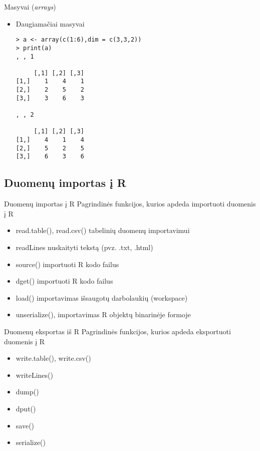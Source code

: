 \documentclass[11pt,xcolor=table]{beamer}
\begin{document}

\begin{frame}[fragile]{Masyvai (\textit{arrays})}
\begin{itemize}
\item Daugiamačiai masyvai
\begin{lstlisting}
> a <- array(c(1:6),dim = c(3,3,2))
> print(a)
, , 1

     [,1] [,2] [,3]
[1,]    1    4    1
[2,]    2    5    2
[3,]    3    6    3

, , 2

     [,1] [,2] [,3]
[1,]    4    1    4
[2,]    5    2    5
[3,]    6    3    6
\end{lstlisting}
\end{itemize}
\end{frame}


\subsection{Duomenų importas į R}

\begin{frame}[fragile]{Duomenų importas į R}
Pagrindinės funkcijos, kurios apdeda importuoti duomenis į R
\begin{itemize}
\item read.table(), read.csv() tabelinių duomenų importavimui
\item readLines nuskaityti tekstą (pvz. .txt, .html)
\item source() importuoti R kodo failus
\item dget() importuoti R kodo failus
\item load() importavimas išsaugotų darbolaukių (workspace)
\item unserialize(), importavimas R objektų binarinėje formoje
\end{itemize}
\end{frame}


\begin{frame}[fragile]{Duomenų eksportas iš R}
Pagrindinės funkcijos, kurios apdeda eksportuoti duomenis į R
\begin{itemize}
\item write.table(), write.csv()
\item writeLines()
\item dump()
\item dput()
\item save()
\item serialize()
\end{itemize}
\end{frame}
\end{document}
